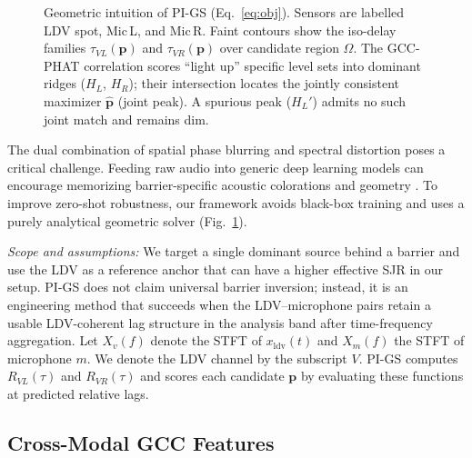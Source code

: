 \documentclass{Interspeech}
\begin{document}
\begin{figure}[t]
{%
  }
  \vspace{-2mm}
  \caption{Geometric intuition of PI-GS (Eq.~\ref{eq:obj}). Sensors are labelled LDV spot, Mic\,L, and Mic\,R. Faint contours show the iso-delay families $\tau_{VL}(\mathbf{p})$ and $\tau_{VR}(\mathbf{p})$ over candidate region $\Omega$. The GCC-PHAT correlation scores ``light up'' specific level sets into dominant ridges ($H_L$, $H_R$); their intersection locates the jointly consistent maximizer $\hat{\mathbf{p}}$ (joint peak). A spurious peak ($H_L'$) admits no such joint match and remains dim.}
  \label{fig:arch}
\end{figure}

The dual combination of spatial phase blurring and spectral distortion poses a critical challenge. Feeding raw audio into generic deep learning models can encourage memorizing barrier-specific acoustic colorations and geometry \cite{ueno2023physics, olivieri2024physics}. To improve zero-shot robustness, our framework avoids black-box training and uses a purely analytical geometric solver (Fig.~\ref{fig:arch}).

\textit{Scope and assumptions:} We target a single dominant source behind a barrier and use the LDV as a reference anchor that can have a higher effective SJR in our setup. PI-GS does not claim universal barrier inversion; instead, it is an engineering method that succeeds when the LDV--microphone pairs retain a usable LDV-coherent lag structure in the analysis band after time-frequency aggregation. Let $X_v(f)$ denote the STFT of $x_{\text{ldv}}(t)$ and $X_m(f)$ the STFT of microphone $m$. We denote the LDV channel by the subscript $V$. PI-GS computes $R_{VL}(\tau)$ and $R_{VR}(\tau)$ and scores each candidate $\mathbf{p}$ by evaluating these functions at predicted relative lags.

\subsection{Cross-Modal GCC Features}
\label{sec:gcc_features}
\end{document}
